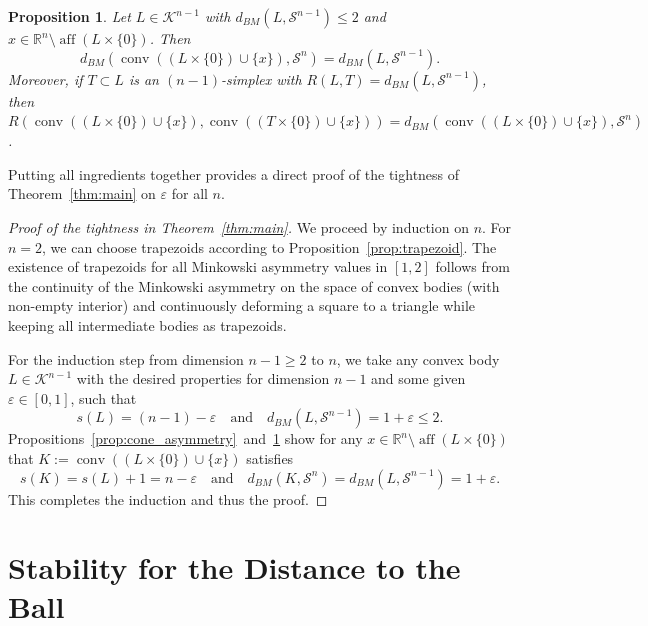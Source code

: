 \documentclass{amsart}
\newtheorem{proposition}[theorem]{Proposition}
\newcommand\R{\mathbb{R}}
\newcommand\CK{\mathcal{K}}
\DeclareMathOperator{\conv}{conv}
\DeclareMathOperator{\aff}{aff}
\newcommand{\simplex}[1]{\mathcal{S}^{#1}}
\newcommand{\embedding}[2]{#1 \times \{#2\}}
\newcommand{\coneembedding}[3]{\conv((\embedding{#1}{#2}) \cup \{#3\})}
\begin{document}
\begin{proposition} \label{prop:cone_distance}
Let $L \in \CK^{n-1}$ with $d_{BM}(L,\simplex{n-1}) \leq 2$
and $x \in \R^n \setminus \aff(\embedding{L}{0})$.
Then
\[
    d_{BM}(\coneembedding{L}{0}{x}, \simplex{n})
    = d_{BM}(L, \simplex{n-1}).
\]
Moreover, if $T \subset L$ is an $(n-1)$-simplex with $R(L,T) = d_{BM}(L,\simplex{n-1})$, then $R(\coneembedding{L}{0}{x}, \coneembedding{T}{0}{x}) = d_{BM}(\coneembedding{L}{0}{x},\simplex{n})$.
\end{proposition}



Putting all ingredients together provides
a direct proof of the tightness of Theorem~\ref{thm:main} on $\varepsilon$ for all $n$.



\begin{proof}[Proof of the tightness in Theorem~\ref{thm:main}]
We proceed by induction on $n$.
For $n = 2$, we can choose trapezoids according to Proposition~\ref{prop:trapezoid}.
The existence of trapezoids for all Minkowski asymmetry values in $[1,2]$ follows from the continuity of the Minkowski asymmetry on the space of convex bodies (with non-empty interior)
and continuously deforming a square to a triangle while keeping all intermediate bodies as trapezoids.

For the induction step from dimension $n-1 \geq 2$ to $n$,
we take any convex body $L \in \CK^{n-1}$
with the desired properties for dimension $n-1$ and some given $\varepsilon \in [0,1]$, such that
\[
    s(L) = (n-1) - \varepsilon
        \quad \text{and} \quad
    d_{BM}(L,\simplex{n-1}) = 1 + \varepsilon \leq 2.
\]
Propositions~\ref{prop:cone_asymmetry}~and~\ref{prop:cone_distance} show for any $x \in \R^n \setminus \aff(\embedding{L}{0})$ that
$K := \coneembedding{L}{0}{x}$ satisfies
\[
    s(K) = s(L) + 1 = n - \varepsilon
        \quad \text{and} \quad
    d_{BM}(K,\simplex{n}) = d_{BM}(L,\simplex{n-1}) = 1 + \varepsilon.
\]
This completes the induction and thus the proof.
\end{proof}





\section{Stability for the Distance to the Ball}\label{sec:StabBall}
\end{document}
